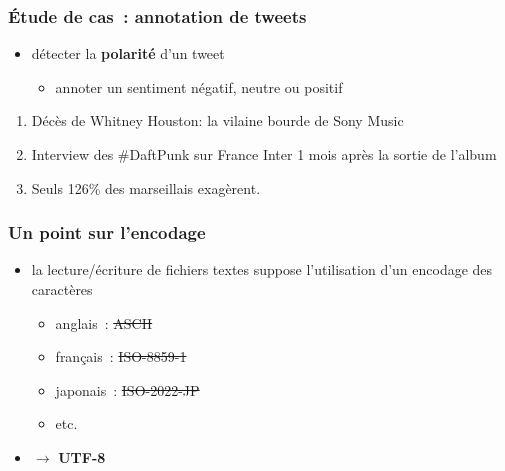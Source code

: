 \begin{frame}
\frametitle{Étude de cas~: annotation de tweets}

\begin{itemize}
    \item détecter la \textbf{polarité} d'un tweet
    \begin{itemize}
        \item annoter un sentiment négatif, neutre ou positif
    \end{itemize}
\end{itemize}

\begin{enumerate} \itemsep5pt
    \item \og{}Décès de Whitney Houston: la vilaine bourde de Sony Music\fg{}
        
    \item \og{}Interview des \#DaftPunk sur France Inter 1 mois après la sortie 
          de l'album\fg{}

    \item \og{}Seuls 126\% des marseillais exagèrent.\fg{}
\end{enumerate}

\end{frame}


\begin{frame}
\frametitle{Un point sur l'encodage}

\begin{itemize} \itemsep0.8em
    \item la lecture/écriture de fichiers textes suppose l'utilisation d'un 
          encodage des caractères
    \begin{itemize}
        \item anglais~: \sout<2>{ASCII}
        \item français~: \sout<2>{ISO-8859-1}
        \item japonais~: \sout<2>{ISO-2022-JP}
        \item etc.
    \end{itemize}

    \Large

    \item<2>[] \alert{$\to$ \textbf{UTF-8}}

\end{itemize}

\end{frame}


